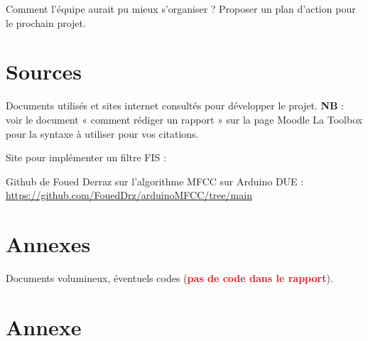 \documentclass[a4paper,11pt]{article}
\begin{document}
Comment l’équipe aurait pu mieux s’organiser ? Proposer un plan d’action pour le prochain projet.
	
\newpage	
\section{Sources}
Documents utilisés et sites internet consultés pour développer le projet.
\textbf{NB} : voir le document « comment rédiger un rapport » sur la page Moodle La Toolbox pour la syntaxe	à utiliser pour vos citations.

Site pour implémenter un filtre FIS : \color{black}

Github de Foued Derraz sur l'algorithme MFCC sur Arduino DUE : \color{blue}\url{https://github.com/FouedDrz/arduinoMFCC/tree/main}\color{black}
	
\newpage
\section{Annexes}
Documents volumineux, éventuels codes (\textbf{\textcolor{red}{pas de code dans le rapport}}).



\clearpage

\section*{\LARGE{Annexe}}
\end{document}
